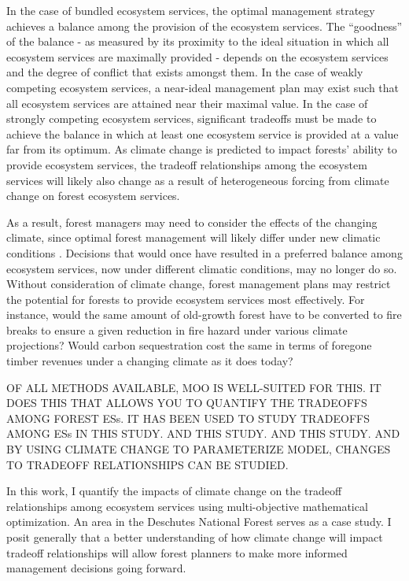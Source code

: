 In the case of bundled ecosystem services, the optimal management strategy achieves a balance among the provision of the ecosystem services. The ``goodness'' of the balance - as measured by its proximity to the ideal situation in which all ecosystem services are maximally provided - depends on the ecosystem services and the degree of conflict that exists amongst them. In the case of weakly competing ecosystem services, a near-ideal management plan may exist such that all ecosystem services are attained near their maximal value. In the case of strongly competing ecosystem services, significant tradeoffs must be made to achieve the balance in which at least one ecosystem service is provided at a value far from its optimum. As climate change is predicted to impact forests' ability to provide ecosystem services, the tradeoff relationships among the ecosystem services will likely also change as a result of heterogeneous forcing from climate change on forest ecosystem services.

As a result, forest managers may need to consider the effects of the changing climate, since %
optimal forest management will likely differ under new climatic conditions \cite{linder2000developing}. Decisions that would once have resulted in a preferred balance among ecosystem services, now under different climatic conditions, may no longer do so. Without consideration of climate change, forest management plans may restrict the potential for forests to provide ecosystem services most effectively. For instance, would the same amount of old-growth forest have to be converted to fire breaks to ensure a given reduction in fire hazard under various climate projections? Would carbon sequestration cost the same in terms of foregone timber revenues under a changing climate as it does today?

OF ALL METHODS AVAILABLE, MOO IS WELL-SUITED FOR THIS. IT DOES THIS THAT ALLOWS YOU TO QUANTIFY THE TRADEOFFS AMONG FOREST ESs. IT HAS BEEN USED TO STUDY TRADEOFFS AMONG ESs IN THIS STUDY. AND THIS STUDY. AND THIS STUDY. AND BY USING CLIMATE CHANGE TO PARAMETERIZE MODEL, CHANGES TO TRADEOFF RELATIONSHIPS CAN BE STUDIED.

In this work, I quantify the impacts of climate change on the tradeoff relationships among ecosystem services using multi-objective mathematical optimization. An area in the Deschutes National Forest serves as a case study. I posit generally that a better understanding of how climate change will impact tradeoff relationships will allow forest planners to make more informed management decisions going forward.

